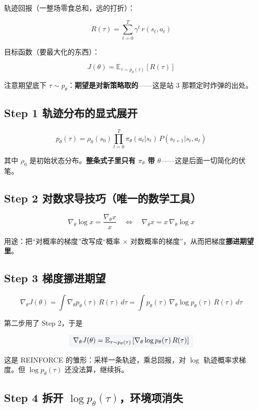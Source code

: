 \documentclass[UTF8,12pt,a4paper]{ctexrep}
\renewcommand{\boxed}[1]{{\colorbox{lightgray}{$\displaystyle #1$}}}
\begin{document}
轨迹回报（一整场零食总和，远的打折）：

$$
R(\tau) = \sum_{t=0}^{T} \gamma^t\, r(s_t, a_t)
$$

目标函数（要最大化的东西）：

$$
J(\theta) = \mathbb{E}_{\tau \sim p_\theta(\tau)}\left[R(\tau)\right]
$$

注意期望底下 $\tau \sim p_\theta$：\textbf{期望是对新策略取的}——这是站 3 那颗定时炸弹的出处。

\subsection*{Step 1 \; 轨迹分布的显式展开}

$$
p_\theta(\tau) = \rho_0(s_0) \prod_{t=0}^{T} \pi_\theta(a_t|s_t)\, P(s_{t+1}|s_t, a_t)
$$

其中 $\rho_0$ 是初始状态分布。\textbf{整条式子里只有 $\pi_\theta$ 带 $\theta$}——这是后面一切简化的伏笔。

\subsection*{Step 2 \; 对数求导技巧（唯一的数学工具）}

$$
\nabla_\theta \log x = \frac{\nabla_\theta x}{x}
\quad\Longleftrightarrow\quad
\nabla_\theta x = x\,\nabla_\theta \log x
$$

用途：把``对概率的梯度''改写成``概率 $\times$ 对数概率的梯度''，从而把梯度\textbf{挪进期望里}。

\subsection*{Step 3 \; 梯度挪进期望}

$$
\nabla_\theta J(\theta) = \int \nabla_\theta p_\theta(\tau)\, R(\tau)\, d\tau
= \int p_\theta(\tau)\, \nabla_\theta \log p_\theta(\tau)\, R(\tau)\, d\tau
$$

第二步用了 Step 2，于是

$$
\boxed{\;\nabla_\theta J(\theta) = \mathbb{E}_{\tau \sim p_\theta(\tau)}\left[\nabla_\theta \log p_\theta(\tau)\, R(\tau)\right]\;}
$$

这是 REINFORCE 的雏形：采样一条轨迹，乘总回报，对 $\log$ 轨迹概率求梯度。但 $\log p_\theta(\tau)$ 还没法算，继续拆。

\subsection*{Step 4 \; 拆开 $\log p_\theta(\tau)$，环境项消失}
\end{document}
